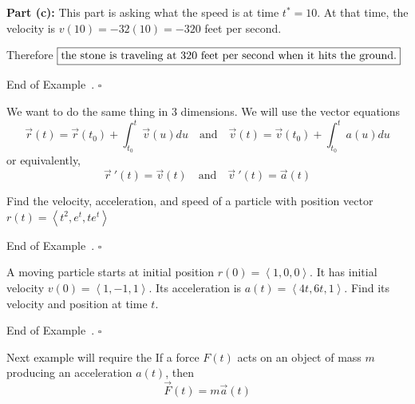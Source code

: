 \documentclass[10pt]{article}
\theoremstyle{definition}
\newtheorem{example}[theorem]{Example}
\renewenvironment{example}
{\begin{oldexample}}
  {\par\smallskip\hfill   End of Example~\theexample. $\square$    \par\end{oldexample}}
\newcommand{\fl}{\noindent\textbf} %
\newcommand{\1}[1]{\textbf{1}_{\left[#1\right]}} %
\newcommand{\dempfcolor}[1]{{\color{RoyalBlue}#1}}
\newcommand{\demph}[1]{\dempfcolor{{\sl #1}}}
\begin{document}
\begin{example}
  \fl{Part (c):} This part is asking what the speed is at time $t^{*}=10$. At that time, the velocity is
  $v(10)=-32(10)=-320$ feet per second.

  Therefore $\boxed{\text{the stone is traveling at } $320$ \text{ feet per second when it hits the ground.}}$
\end{example}

We want to do the same thing in 3 dimensions. We will use the vector equations
\begin{equation*}
  \vec{r}(t) 
  = \vec{r}(t_{0}) + \int_{t_{0}}^{t}\vec{v}(u)du
  \quad \text{and} \quad
  \vec{v}(t) 
  = \vec{v}(t_{0}) + \int_{t_{0}}^{t}a(u)du  
\end{equation*}
or equivalently,
\begin{equation*}
  \vec{r}\ '(t) = \vec{v}(t)
  \quad \text{and} \quad 
  \vec{v}\ '(t) = \vec{a}(t)
\end{equation*}
\begin{example}
  Find the velocity, acceleration,  and speed of a particle with position vector $r(t) = \left\langle
    t^{2},e^{t},t e^{t} \right\rangle $
\end{example}

\begin{example}
  A moving particle starts at initial position $r(0)=\left\langle 1,0,0 \right\rangle$. It has initial
  velocity $v(0) = \left\langle 1,-1,1 \right\rangle$. Its acceleration is $a(t) = \left\langle 4t,6t,1
  \right\rangle$. Find its velocity and position at time $t$.
\end{example}

Next example will require the \demph{Netwon's Second Law:} If a force $F(t)$ acts on an object of mass
$m$ producing an acceleration $a(t)$, then
\begin{equation*}
  \vec{F}(t) = m\vec{a}(t)
\end{equation*}
\end{document}
